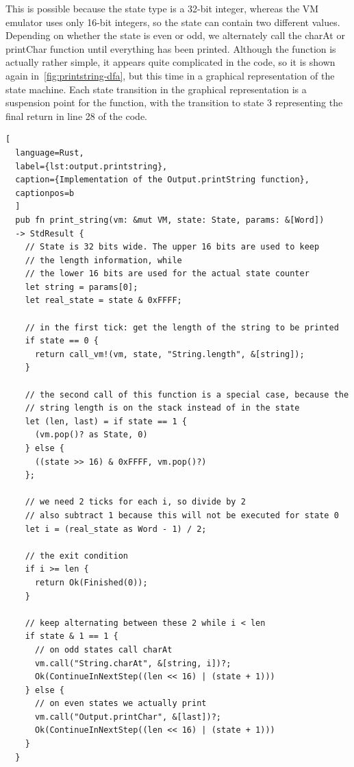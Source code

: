 This is possible because the state type is a 32-bit integer, whereas the VM emulator uses only 16-bit integers, so the state can contain two different values.
Depending on whether the state is even or odd, we alternately call the charAt or printChar function until everything has been printed.
Although the function is actually rather simple, it appears quite complicated in the code, so it is shown again in~\cref{fig:printstring-dfa}, but this time in a graphical representation of the state machine.
Each state transition in the graphical representation is a suspension point for the function, with the transition to state \(3\) representing the final return in line 28 of the code.

\begin{lstlisting}[
  language=Rust,
  label={lst:output.printstring},
  caption={Implementation of the Output.printString function},
  captionpos=b
  ]
  pub fn print_string(vm: &mut VM, state: State, params: &[Word])
  -> StdResult {
    // State is 32 bits wide. The upper 16 bits are used to keep
    // the length information, while
    // the lower 16 bits are used for the actual state counter
    let string = params[0];
    let real_state = state & 0xFFFF;

    // in the first tick: get the length of the string to be printed
    if state == 0 {
      return call_vm!(vm, state, "String.length", &[string]);
    }

    // the second call of this function is a special case, because the
    // string length is on the stack instead of in the state
    let (len, last) = if state == 1 {
      (vm.pop()? as State, 0)
    } else {
      ((state >> 16) & 0xFFFF, vm.pop()?)
    };

    // we need 2 ticks for each i, so divide by 2
    // also subtract 1 because this will not be executed for state 0
    let i = (real_state as Word - 1) / 2;

    // the exit condition
    if i >= len {
      return Ok(Finished(0));
    }

    // keep alternating between these 2 while i < len
    if state & 1 == 1 {
      // on odd states call charAt
      vm.call("String.charAt", &[string, i])?;
      Ok(ContinueInNextStep((len << 16) | (state + 1)))
    } else {
      // on even states we actually print
      vm.call("Output.printChar", &[last])?;
      Ok(ContinueInNextStep((len << 16) | (state + 1)))
    }
  }
\end{lstlisting}


